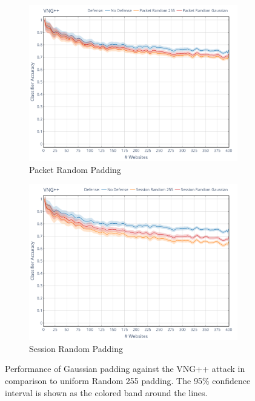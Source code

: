 \documentclass[
	ruledheaders=chapter,
	class=report,
	thesis={type=master, department=inf},
	accentcolor=1c,
	custommargins=true,
	marginpar=false,
	parskip=half-,
	fontsize=11pt,
]{tudapub}
\begin{document}
	\begin{figure}
		\begin{subfigure}{0.495\textwidth}
			\centering
			\includegraphics[width=\textwidth]{plots/performance_vng++_pkt.png}
			\caption{Packet Random Padding}
		\end{subfigure}
		\hfill
		\begin{subfigure}{0.495\textwidth}
			\centering
			\includegraphics[width=\textwidth]{plots/performance_vng++_ses.png}
			\caption{Session Random Padding}
		\end{subfigure}
		\caption[Performance of Gaussian padding against the VNG++ attack]{Performance of Gaussian padding against the VNG++ attack \cite{Dyer2012} in comparison to uniform Random 255 padding. The 95\% confidence interval is shown as the colored band around the lines.}
		\label{fig:vng++}
	\end{figure}
\end{document}
